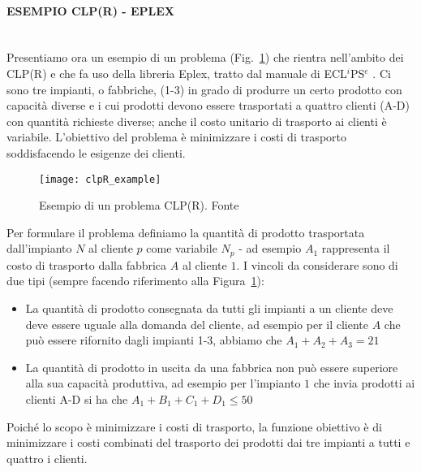 \documentclass[12pt,a4paper,openright,twoside]{report}
\newcommand{\myparagraph}[1]{\paragraph{#1}\mbox{}\\}
\begin{document}
\myparagraph{ESEMPIO CLP(R) - EPLEX}

Presentiamo ora un esempio di un problema (Fig.~\ref{clpR_example}) che rientra nell'ambito dei CLP(R) e che fa uso della libreria Eplex, tratto dal manuale di ECL$^i$PS$^e$ \cite{eclipseTut}. Ci sono tre impianti, o fabbriche, (1-3) in grado di produrre un certo prodotto con capacità diverse e i cui prodotti devono essere trasportati a quattro clienti (A-D) con quantità richieste diverse; anche il costo unitario di trasporto ai clienti è variabile. L'obiettivo del problema è minimizzare i costi di trasporto soddisfacendo le esigenze dei clienti. 

\begin{figure}[h]
	\centering
	\texttt{[image: clpR\_example]}
	\caption{Esempio di un problema CLP(R). Fonte \cite{eclipseTut}}
	\label{clpR_example}
\end{figure}

Per formulare il problema definiamo la quantità di prodotto trasportata dall'impianto $N$ al cliente $p$ come variabile $N_p$ - ad esempio $A_1$ rappresenta il costo di trasporto dalla fabbrica $A$ al cliente $1$. I vincoli da considerare sono di due tipi (sempre facendo riferimento alla Figura~\ref{clpR_example}):
\begin{itemize}
\item La quantità di prodotto consegnata da tutti gli impianti a un cliente deve deve essere uguale alla domanda del cliente, ad esempio per il cliente $A$ che può essere rifornito dagli impianti 1-3, abbiamo che $A_1+A_2+A_3=21$
\item La quantità di prodotto in uscita da una fabbrica non può essere superiore alla sua capacità produttiva, ad esempio per l'impianto $1$ che invia prodotti ai clienti A-D si ha che $A_1+B_1+C_1+D_1 \leq 50$
\end{itemize}   
Poiché lo scopo è minimizzare i costi di trasporto, la funzione obiettivo è di minimizzare i costi combinati del trasporto dei prodotti dai tre impianti a tutti e quattro i clienti.
\end{document}
